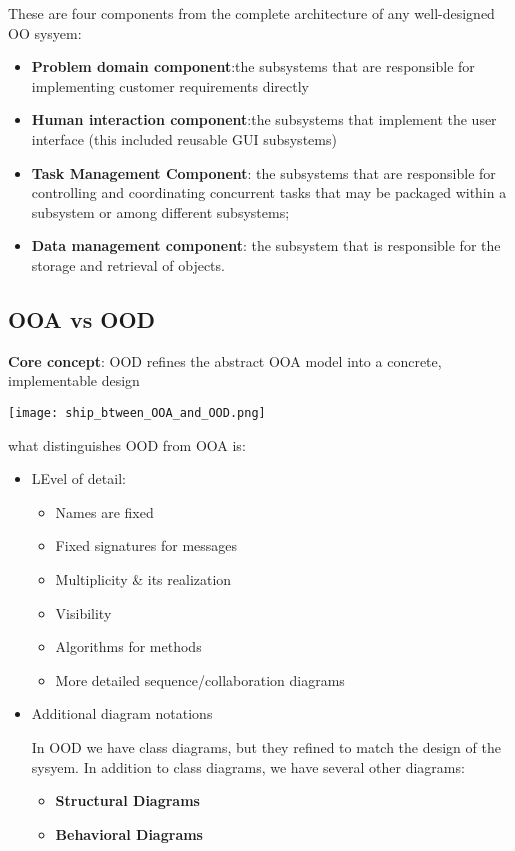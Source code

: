 These are four components from the complete architecture of any well-designed OO sysyem:
\begin{itemize}
    \item \textbf{Problem domain component}:the subsystems that are
responsible for implementing customer requirements
directly
    \item \textbf{Human interaction component}:the subsystems that implement the user interface (this included reusable GUI subsystems)
    \item \textbf{Task Management Component}: the subsystems that are responsible for controlling and coordinating concurrent tasks that may be packaged within a subsystem or among different subsystems;
    \item \textbf{Data management component}: the subsystem that is responsible for the storage and retrieval of objects.
\end{itemize}

\subsection{OOA vs OOD}
\textbf{Core concept}: OOD refines the abstract OOA model into a concrete, implementable design

\begin{center}
    \texttt{[image: ship\_btween\_OOA\_and\_OOD.png]}
\end{center}
what distinguishes OOD from OOA is:
\begin{itemize}
    \item LEvel of detail:
    \begin{itemize}
        \item Names are fixed
        \item Fixed signatures for messages
        \item Multiplicity & its realization
        \item Visibility
        \item Algorithms for methods
        \item More detailed sequence/collaboration diagrams
    \end{itemize}
    \item Additional diagram notations
    
    In OOD we have class diagrams, but they refined to match the design of the sysyem.  In addition to class diagrams, we have several other diagrams:

    \begin{itemize}
        \item \textbf{Structural Diagrams}
        \item \textbf{Behavioral Diagrams}
    \end{itemize}
\end{itemize}
